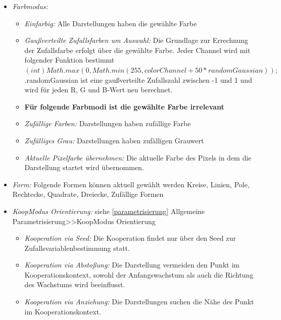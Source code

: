\documentclass[../mciAusarbeitung.tex]{subfiles}
\begin{document}
\begin{itemize}
	\setlength\itemsep{-0.1em}
		\item\textit{Farbmodus:} 
			\begin{itemize}
			\setlength\itemsep{-0.1em}
				\item\textit{Einfarbig:}
						Alle Darstellungen haben die gewählte Farbe	
				\item\textit{Gaußverteilte Zufallsfarben um Auswahl:}
						Die Grundlage zur Errechnung der Zufallsfarbe erfolgt über die gewählte Farbe.
						Jeder Channel wird mit folgender Funktion bestimmt \\
						$(int) Math.max(0, Math.min(255, colorChannel + 50 * randomGaussian));$\\
						.randomGaussian ist eine gaußverteilte Zufallszahl zwischen -1 und 1 und wird für jeden R, G und B-Wert neu berechnet.
				\item[]\textbf{Für folgende Farbmodi ist die gewählte Farbe irrelevant}
				\item\textit{Zufällige Farben:} Darstellungen haben zufällige Farbe 
				\item\textit{Zufälliges Grau:} Darstellungen haben zufälligen Grauwert 		
				\item\textit{Aktuelle Pixelfarbe übernehmen:} Die aktuelle Farbe des Pixels in dem die Darstellung startet wird übernommen. 	
			\end{itemize}
	\item\textit{Form:} Folgende Formen können aktuell gewählt werden {Kreise, Linien, Pole, Rechtecke, Quadrate, Dreiecke, Zufällige Formen}
	\item\textit{KoopModus Orientierung:}  siehe \ref{parametrisierung} Allgemeine Parametrisierung>>KoopModus Orientierung
			\begin{itemize}
			\setlength\itemsep{-0.1em}
				\item\textit{Kooperation via Seed:} Die Kooperation findet nur über den Seed zur Zufallsvariablenbestimmung statt. 
				\item\textit{Kooperation via Abstoßung:} Die Darstellung vermeiden den Punkt im Kooperationskontext, sowohl der Anfangswachstum als auch die Richtung des Wachstums wird beeinflusst.
				\item\textit{Kooperation via Anziehung:} Die Darstellungen suchen die Nähe des Punkt im Kooperationskontext.
			\end{itemize}
\end{itemize}

%
%
\end{document}
